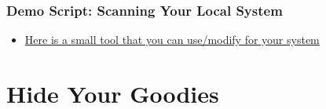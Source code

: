 \documentclass[aspectratio=169]{beamer}
\makeatletter
\def\sectionsubtitle#1{\gdef\@sectionsubtitle{#1}}
\gdef\@sectionsubtitle{}
\makeatother
\begin{document}
%
\begin{frame}
	\frametitle{Demo Script: Scanning Your Local System}
	\begin{itemize}
        \item\href{ https://github.com/devsecfranklin/stash-house/tree/main/demo/01_scanner}{Here is a small tool that you can use/modify for your system}
	\end{itemize}
\end{frame}

{
	\sectionsubtitle{We found the secrets, now what?}
	\section{Hide Your Goodies}
}
\end{document}
